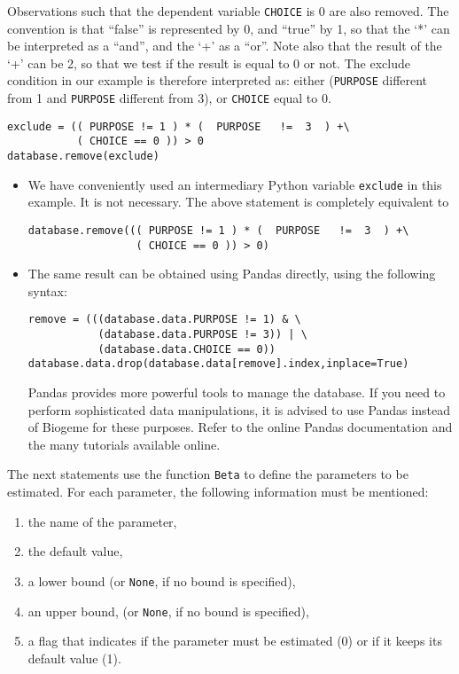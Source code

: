 \documentclass[12pt,a4paper]{article}
\begin{document}
Observations such that the dependent variable \lstinline$CHOICE$ is 0 are also
removed. The convention is that ``false'' is represented by 0,
and ``true'' by 1, so that the `*' can be interpreted as a ``and'',
and the `+' as a ``or''. Note also that the result of the `+' can be
2, so that we test if the result is equal to 0 or not. The exclude condition in our example is
therefore interpreted as: either (\lstinline$PURPOSE$ different from 1
and \lstinline$PURPOSE$ different from 3), or \lstinline$CHOICE$ equal
to 0. 

\begin{lstlisting}[style=nonumbers]
exclude = (( PURPOSE != 1 ) * (  PURPOSE   !=  3  ) +\
           ( CHOICE == 0 )) > 0
database.remove(exclude)
\end{lstlisting}

\begin{itemize}
\item We have conveniently used an intermediary Python variable
\lstinline+exclude+ in this example. It is not necessary. The above
statement is completely equivalent to 
\begin{lstlisting}[style=nonumbers]
database.remove((( PURPOSE != 1 ) * (  PURPOSE   !=  3  ) +\
                 ( CHOICE == 0 )) > 0)
\end{lstlisting}
\item The same result can be obtained using Pandas
directly, using the following syntax:
\begin{lstlisting}[style=nonumbers]
remove = (((database.data.PURPOSE != 1) & \
           (database.data.PURPOSE != 3)) | \
           (database.data.CHOICE == 0))
database.data.drop(database.data[remove].index,inplace=True)
\end{lstlisting}
Pandas provides more powerful tools to manage the database. If you
need to perform sophisticated data manipulations, it is advised to use
Pandas instead of Biogeme for these purposes. Refer to the online
Pandas documentation and the many tutorials available online. 
\end{itemize}

The next statements use the function \lstinline+Beta+ to define the parameters to be estimated. For each parameter, the following information must be mentioned:
\begin{enumerate}
\item the name of the parameter,
\item the default value,
\item a lower bound (or \lstinline+None+, if no bound is specified),
\item an upper bound, (or \lstinline+None+, if no bound is specified),
\item a flag that indicates if the parameter must be estimated (0) or
  if it keeps its default value (1).
\end{enumerate}
\end{document}
